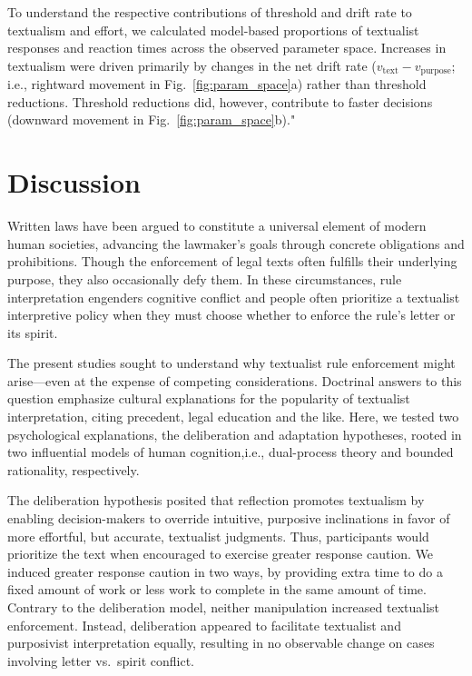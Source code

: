 \documentclass[pdflatex,sn-nature]{sn-jnl}
\begin{document}
To understand the respective contributions of threshold and drift rate to textualism and effort, we calculated model-based proportions of textualist responses and reaction times across the observed parameter space. Increases in textualism were driven primarily by changes in the net drift rate ($v_\text{text} - v_\text{purpose}$; i.e., rightward movement in Fig.~\ref{fig:param_space}a) rather than threshold reductions. Threshold reductions did, however, contribute to faster decisions (downward movement in Fig.~\ref{fig:param_space}b)."

\section{Discussion}\label{sec:discussion}

Written laws have been argued to constitute a universal element of modern human societies\cite{ref23,ref24,ref25}, advancing the lawmaker's goals through concrete obligations and prohibitions. Though the enforcement of legal texts often fulfills their underlying purpose\cite{ref26,ref27,ref28}, they also occasionally defy them\cite{ref3,ref8,ref29}. In these circumstances, rule interpretation engenders cognitive conflict and people often prioritize a textualist interpretive policy when they must choose whether to enforce the rule's letter or its spirit\cite{ref30,ref31,ref32,ref33,ref34}.

The present studies sought to understand why textualist rule enforcement might arise---even at the expense of competing considerations. Doctrinal answers to this question emphasize cultural explanations for the popularity of textualist interpretation, citing precedent, legal education and the like. Here, we tested two psychological explanations, the deliberation and adaptation hypotheses, rooted in two influential models of human cognition,i.e., dual-process theory and bounded rationality\cite{ref10,ref35,ref36}, respectively. 

The deliberation hypothesis posited that reflection promotes textualism by enabling decision-makers to override intuitive, purposive inclinations in favor of more effortful, but accurate, textualist judgments. Thus, participants would prioritize the text when encouraged to exercise greater response caution. We induced greater response caution in two ways, by providing extra time to do a fixed amount of work or less work to complete in the same amount of time. Contrary to the deliberation model, neither manipulation increased textualist enforcement. Instead, deliberation appeared to facilitate textualist and purposivist interpretation equally, resulting in no observable change on cases involving letter vs.\ spirit conflict. 
\end{document}
